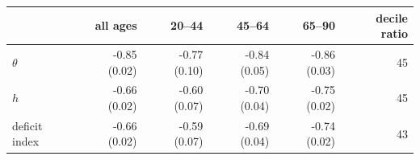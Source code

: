 \begin{tabular}{lrrrrr}
\toprule
 & all ages & 20--44 & 45--64 & 65--90 & decile ratio \\
\midrule
$\theta$ & -0.85 (0.02) & -0.77 (0.10) & -0.84 (0.05) & -0.86 (0.03) & 45 \\
$h$ & -0.66 (0.02) & -0.60 (0.07) & -0.70 (0.04) & -0.75 (0.02) & 45 \\
deficit index & -0.66 (0.02) & -0.59 (0.07) & -0.69 (0.04) & -0.74 (0.02) & 43 \\
\bottomrule
\end{tabular}
